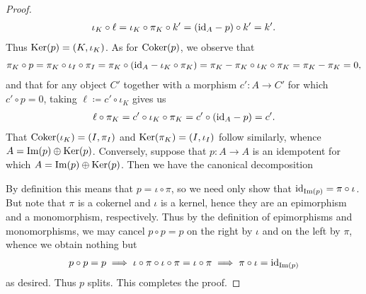 \begin{proof}
\begin{align*}
\begin{split}
\iota_K \circ \ell = \iota_K \circ \pi_K \circ k' = (\textnormal{id}_A - p) \circ k' = k'.
\end{split}
\end{align*}
\noindent Thus $\textnormal{Ker}(p) = (K, \iota_K)$. As for $\textnormal{Coker}(p)$, we observe that
\begin{align*}
\begin{split}
\pi_K \circ p = \pi_K \circ \iota_I \circ \pi_I = \pi_K \circ (\textnormal{id}_A - \iota_K \circ \pi_K) = \pi_K - \pi_K \circ \iota_K \circ \pi_K = \pi_K - \pi_K = 0,
\end{split}
\end{align*}
\noindent and that for any object $C'$ together with a morphism $c' : A \to C'$ for which $c' \circ p = 0$, taking $\ell \coloneqq c' \circ \iota_K$ gives us
\begin{align*}
\begin{split}
\ell \circ \pi_K = c' \circ \iota_K \circ \pi_K = c' \circ (\textnormal{id}_A - p) = c'.
\end{split}
\end{align*}
\noindent That $\textnormal{Coker}(\iota_K) = (I, \pi_I)$ and $\textnormal{Ker}(\pi_K) = (I, \iota_I)$ follow similarly, whence $A = \textnormal{Im}(p) \oplus \textnormal{Ker}(p)$.\newpage%
\noindent Conversely, suppose that $p : A \to A$ is an idempotent for which $A = \textnormal{Im}(p) \oplus \textnormal{Ker}(p)$. Then we have the canonical decomposition
\begin{center}
\end{center}
\noindent By definition this means that $p = \iota \circ \pi$, so we need only show that $\textnormal{id}_{\textnormal{Im}(p)} = \pi \circ \iota$. But note that $\pi$ is a cokernel and $\iota$ is a kernel, hence they are an epimorphism and a monomorphism, respectively. Thus by the definition of epimorphisms and monomorphisms, we may cancel $p \circ p = p$ on the right by $\iota$ and on the left by $\pi$, whence we obtain nothing but
\begin{align*}
\begin{split}
p \circ p = p \implies \iota \circ \pi \circ \iota \circ \pi = \iota \circ \pi \implies \pi \circ \iota = \textnormal{id}_{\textnormal{Im}(p)}
\end{split}
\end{align*}
\noindent as desired. Thus $p$ splits. This completes the proof.
\end{proof}\\

